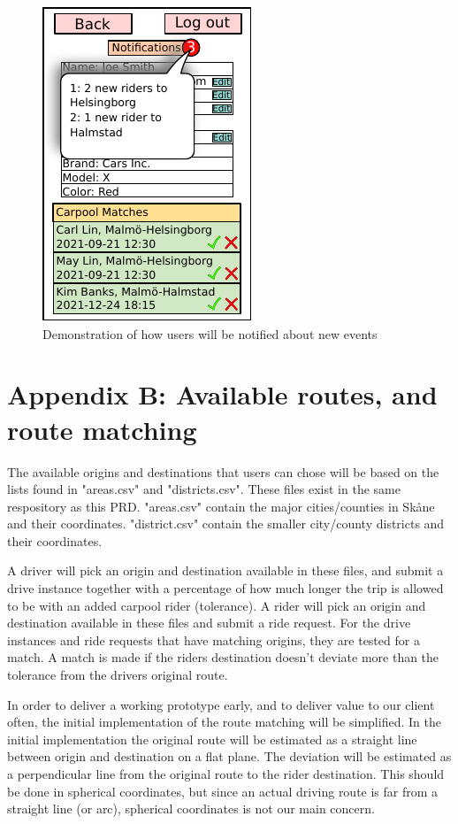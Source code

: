\documentclass{article}
\begin{document}
\begin{figure}[!htpb]
\begin{minipage}{0.25\textwidth}
        \centering
        \includegraphics[scale=1]{prdFigures/profile3.pdf}
        \caption{Demonstration of how users will be notified about new events}
        \label{fig:profile3}
    \end{minipage}\hfill
\end{figure}

\newpage
\section{Appendix B: Available routes, and route matching}
The available origins and destinations that users can chose will be based on the lists found in "areas.csv" and "districts.csv". These files exist in the same respository as this PRD. "areas.csv" contain the major cities/counties in Skåne and their coordinates. "district.csv" contain the smaller city/county districts and their coordinates.

A driver will pick an origin and destination available in these files, and submit a drive instance together with a percentage of how much longer the trip is allowed to be with an added carpool rider (tolerance). A rider will pick an origin and destination available in these files and submit a ride request. For the drive instances and ride requests that have matching origins, they are tested for a match. A match is made if the riders destination doesn't deviate more than the tolerance from the drivers original route.

In order to deliver a working prototype early, and to deliver value to our client often, the initial implementation of the route matching will be simplified. In the initial implementation the original route will be estimated as a straight line between origin and destination on a flat plane. The deviation will be estimated as a perpendicular line from the original route to the rider destination. This should be done in spherical coordinates, but since an actual driving route is far from a straight line (or arc), spherical coordinates is not our main concern.
\end{document}
